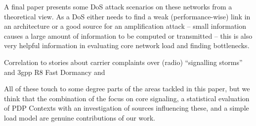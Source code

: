 A final paper \cite{Ricciato2010551} presents some \gls{DoS} attack scenarios on these networks from a theoretical view. As a \gls{DoS} either needs to find a weak (performance-wise) link in an architecture or a good source for an amplification attack -- small information causes a large amount of information to be computed or transmitted -- this is also very helpful information in evaluating core network load and finding bottlenecks.

Correlation to stories about carrier complaints over (radio) ``signalling storms''  and 3gpp R8 Fast Dormancy \cite{3gpp.25.331} and \cite{gsma2011fdbestpract}





All of these touch to some degree parts of the areas tackled in this paper, but we think that the combination of the focus on core signaling, a statistical evaluation of PDP Contexts with an investigation of sources influencing these, and a simple load model are genuine contributions of our work.
